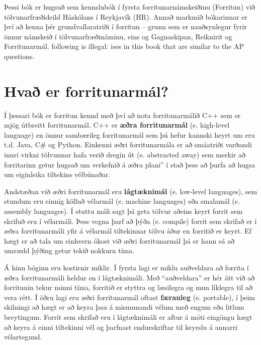 Þessi bók er hugsuð sem kennslubók í fyrsta forritunarnámskeiðinu (Forritun) við tölvunarfræðideild Háskólans í Reykjavík (HR).
Annað markmið bókarinnar er því að kenna þér grundvallaratriði í forritun -- grunn sem er nauðsynlegur fyrir önnur námskeið í tölvunarfræðináminu, eins og Gagnaskipan, Reiknirit og Forritunarmál.
following is illegal: ises in this book that are similar to the AP questions.

\section{Hvað er forritunarmál?}

Í þessari bók er forritun kennd með því að nota forritunarmálið C++ sem er mjög útbreitt forritunarmál.
C++ er {\bf æðra forritunarmál} (e. high-level language) en önnur sambærileg forritunarmál sem þú hefur kannski heyrt um eru t.d. Java, C{\#} og Python.
Einkenni æðri forritunarmála er að smáatriði varðandi innri virkni tölvunnar hafa verið dregin út (e. abstracted away) sem merkir að forritarinn getur hugsað um verkefnið á æðra plani'' í stað þess að þurfa að hugsa um eiginleika tiltekins vélbúnaðar.

Andstæðan við æðri forritunarmál eru {\bf lágtæknimál} (e. low-level languages), sem stundum eru einnig kölluð vélarmál (e. machine languages) eða smalamál (e. assembly languages).
Í stuttu máli sagt þá geta tölvur aðeins keyrt forrit sem skrifuð eru í vélarmáli.
Þess vegna þarf að þýða (e. compile) forrit sem skrifað er í æðra forritunarmáli yfir á vélarmál tiltekinnar tölvu áður en forritið er keyrt.
Ef hægt er að tala um einhvern ókost við æðri forritunarmál þá er hann sá að umrædd þýðing getur tekið nokkurn tíma.


Á hinn bóginn eru kostirnir miklir.
Í fyrsta lagi er miklu auðveldara að forrita í æðra forritunarmáli heldur en í lágtæknimáli.
Með ``auðveldara'' er hér átt við að forritunin tekur minni tíma, forritið er styttra og læsilegra og mun líklegra til að vera rétt.
Í öðru lagi eru æðri forritunarmál oftast {\bf færanleg} (e. portable), í þeim skilningi að hægt er að keyra þau á mismunandi vélum með engum eða litlum breytingum.
Forrit sem skrifað eru í lágtæknimáli er aftur á móti eingöngu hægt að keyra á einni tiltekinni vél og þarfnast endurskriftar til keyrslu á annarri vélartegund.

